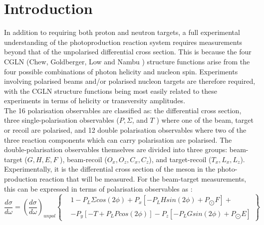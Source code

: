 \section{Introduction}
In addition to requiring both proton and neutron targets, a full experimental understanding of the photoproduction reaction system requires measurements
beyond that of the unpolarised differential cross section. This is because the four CGLN (Chew, Goldberger, Low and Nambu \cite{PhysRev.106.1337} \cite{PhysRev.106.1345}) structure functions arise from the four possible combinations of photon helicity and nucleon spin. Experiments involving polarised beams and/or polarised nucleon targets are therefore required, with the CGLN  structure functions being most easily related to these experiments in terms of helicity or transversity amplitudes. \\
The 16 polarisation observables are classified as: the differential cross section, three single-polarisation observables ($P, \Sigma$, and $T$ ) where one of the beam, target
or recoil are polarised, and 12 double polarisation observables where two of the three reaction components which can carry polarisation are polarised. The
double-polarisation observables themselves are divided into three groups: beam-target ($G, H, E, F$ ), beam-recoil ($O_x , O_z, C_x , C_z$), and target-recoil ($T_x , L_x , L_z$).
Experimentally, it is the differential cross section of the meson in the photo-production reaction that will be measured. For the beam-target measurements, this can be expressed in terms of polarisation observables as \cite{Bark_1974}:
\begin{equation}
\frac{d\sigma}{d\omega} = \left(\frac{d\sigma}{d\omega} \right)_{unpol}  \left\{ 
\begin{aligned}
    & 1 - P_L \Sigma cos(2\phi) + P_x \left[-P_L H sin(2\phi) + P_{\bigodot}F\right] + \\
& -P_y \left[ -T +P_L P cos(2\phi)\right] -P_z \left[-P_L G sin(2\phi) + P_{\bigodot}E\right]
\end{aligned}
\right\} 
\end{equation}
